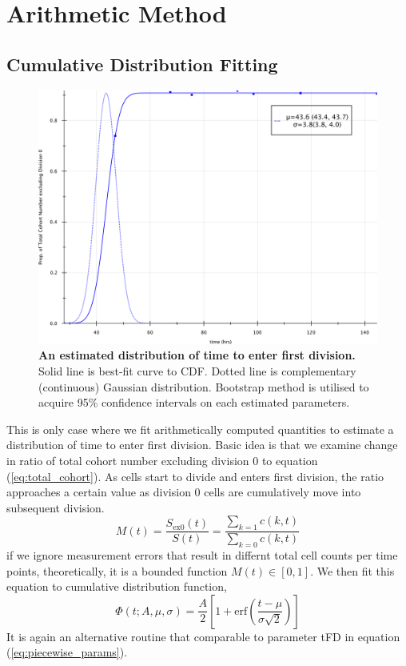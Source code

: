 \documentclass{article}
\newcommand{\enterProblemHeader}[1]{
}
\newcommand{\exitProblemHeader}[1]{
}
\newcounter{homeworkProblemCounter} %
\newcommand{\homeworkProblemName}{}
\newenvironment{homeworkProblem}[1][Problem \arabic{homeworkProblemCounter}]{ %
\stepcounter{homeworkProblemCounter} %
\renewcommand{\homeworkProblemName}{#1} %
\section{\homeworkProblemName} %
\enterProblemHeader{\homeworkProblemName} %
}{
\exitProblemHeader{\homeworkProblemName} %
}
\newcommand{\erf}{\mathrm{erf}}
\begin{document}
\begin{homeworkProblem}[Arithmetic Method]
\subsection{Cumulative Distribution Fitting}
\begin{figure}[t]
    \centering
    \includegraphics[scale=0.38]{./img/cdf.png}
    \caption{\textbf{An estimated distribution of time to enter first division.} Solid line is best-fit curve to CDF. Dotted line is complementary (continuous) Gaussian distribution. Bootstrap method is utilised to acquire 95\% confidence intervals on each estimated parameters.}
\end{figure}
This is only case where we fit arithmetically computed quantities to estimate a distribution of time to enter first division. Basic idea is that we examine change in ratio of total cohort number excluding division 0 to equation (\ref{eq:total_cohort}). As cells start to divide and enters first division, the ratio approaches a certain value as division 0 cells are cumulatively move into subsequent division.
\begin{equation}
    M(t) = \frac{S_{\mathrm{ex0}}(t)}{S(t)} = \frac{\sum_{k=1} c(k,t)}{\sum_{k=0} c(k,t)}
\end{equation}
if we ignore measurement errors that result in differnt total cell counts per time points, theoretically, it is a bounded function $M(t) \in [0, 1]$. We then fit this equation to cumulative distribution function,
\begin{equation}
    \Phi(t;A,\mu,\sigma) = \frac{A}{2} \left[1 + \erf\left(\frac{t-\mu}{\sigma\sqrt{2}}\right) \right]
\end{equation}
It is again an alternative routine that comparable to parameter tFD in equation (\ref{eq:piecewise_params}).

\end{homeworkProblem}
\end{document}
